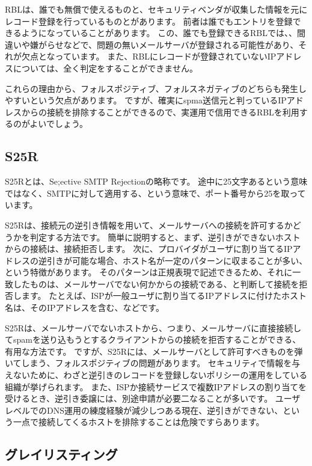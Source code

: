 RBLは、誰でも無償で使えるものと、セキュリティベンダが収集した情報を元にレコード登録を行っているものとがあります。
前者は誰でもエントリを登録できるようになっていることがあります。
この、誰でも登録できるRBLでは、、間違いや嫌がらせなどで、問題の無いメールサーバが登録される可能性があり、それが欠点となっています。
また、RBLにレコードが登録されていないIPアドレスについては、全く判定をすることができません。

これらの理由から、フォルスポジティブ、フォルスネガティブのどちらも発生しやすいという欠点があります。
ですが、確実にspma送信元と判っているIPアドレスからの接続を排除することができるので、実運用で信用できるRBLを利用するのがよいでしょう。

\subsection{S25R}

S25Rとは、Se;ective SMTP Rejectionの略称です。
途中に25文字あるという意味ではなく、SMTPに対して適用する、という意味で、ポート番号から25を取っています。

S25Rは、接続元の逆引き情報を用いて、メールサーバへの接続を許可するかどうかを判定する方法です。
簡単に説明すると、まず、逆引きができないホストからの接続は、接続拒否します。
次に、プロバイダがユーザに割り当てるIPアドレスの逆引きが可能な場合、ホスト名が一定のパターンに収まることが多い、という特徴があります。
そのパターンは正規表現で記述できるため、それに一致したものは、メールサーバでない何かからの接続である、と判断して接続を拒否します。
たとえば、ISPが一般ユーザに割り当てるIPアドレスに付けたホスト名は、そのIPアドレスを含む、などです。

S25Rは、メールサーバでないホストから、つまり、メールサーバに直接接続してspamを送り込もうとするクライアントからの接続を拒否することができる、有用な方法です。
ですが、S25Rには、メールサーバとして許可すべきものを弾いてしまう、フォルスポジティブの問題があります。
セキュリティで情報を与えないために、わざと逆引きのレコードを登録しないポリシーの運用をしている組織が挙げられます。
また、ISPか接続サービスで複数IPアドレスの割り当てを受けるとき、逆引き委譲には、別途申請が必要二なることが多いです。
ユーザレベルでのDNS運用の練度経験が減少しつある現在、逆引きができない、という一点で接続してくるホストを排除することは危険ですらあります。

\subsection{グレイリスティング}

